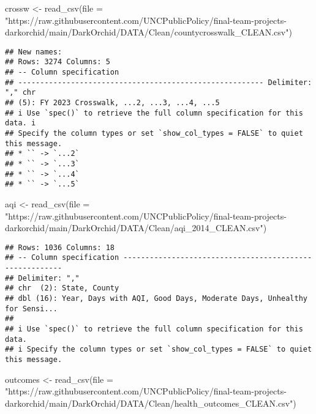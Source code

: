 \documentclass[
]{article}
\newenvironment{Shaded}{\begin{snugshade}}{\end{snugshade}}
\newcommand{\AttributeTok}[1]{\textcolor[rgb]{0.77,0.63,0.00}{#1}}
\newcommand{\FunctionTok}[1]{\textcolor[rgb]{0.00,0.00,0.00}{#1}}
\newcommand{\NormalTok}[1]{#1}
\newcommand{\OtherTok}[1]{\textcolor[rgb]{0.56,0.35,0.01}{#1}}
\newcommand{\StringTok}[1]{\textcolor[rgb]{0.31,0.60,0.02}{#1}}
\begin{document}
\begin{Shaded}
\begin{Highlighting}[]
\NormalTok{crossw }\OtherTok{\textless{}{-}} \FunctionTok{read\_csv}\NormalTok{(}\AttributeTok{file =} \StringTok{"https://raw.githubusercontent.com/UNCPublicPolicy/final{-}team{-}projects{-}darkorchid/main/DarkOrchid/DATA/Clean/countycrosswalk\_CLEAN.csv"}\NormalTok{)}
\end{Highlighting}
\end{Shaded}

\begin{verbatim}
## New names:
## Rows: 3274 Columns: 5
## -- Column specification
## -------------------------------------------------------- Delimiter: "," chr
## (5): FY 2023 Crosswalk, ...2, ...3, ...4, ...5
## i Use `spec()` to retrieve the full column specification for this data. i
## Specify the column types or set `show_col_types = FALSE` to quiet this message.
## * `` -> `...2`
## * `` -> `...3`
## * `` -> `...4`
## * `` -> `...5`
\end{verbatim}

\begin{Shaded}
\begin{Highlighting}[]
\NormalTok{aqi }\OtherTok{\textless{}{-}} \FunctionTok{read\_csv}\NormalTok{(}\AttributeTok{file =} \StringTok{"https://raw.githubusercontent.com/UNCPublicPolicy/final{-}team{-}projects{-}darkorchid/main/DarkOrchid/DATA/Clean/aqi\_2014\_CLEAN.csv"}\NormalTok{)}
\end{Highlighting}
\end{Shaded}

\begin{verbatim}
## Rows: 1036 Columns: 18
## -- Column specification --------------------------------------------------------
## Delimiter: ","
## chr  (2): State, County
## dbl (16): Year, Days with AQI, Good Days, Moderate Days, Unhealthy for Sensi...
## 
## i Use `spec()` to retrieve the full column specification for this data.
## i Specify the column types or set `show_col_types = FALSE` to quiet this message.
\end{verbatim}

\begin{Shaded}
\begin{Highlighting}[]
\NormalTok{outcomes }\OtherTok{\textless{}{-}} \FunctionTok{read\_csv}\NormalTok{(}\AttributeTok{file =} \StringTok{"https://raw.githubusercontent.com/UNCPublicPolicy/final{-}team{-}projects{-}darkorchid/main/DarkOrchid/DATA/Clean/health\_outcomes\_CLEAN.csv"}\NormalTok{)}
\end{Highlighting}
\end{Shaded}
\end{document}
